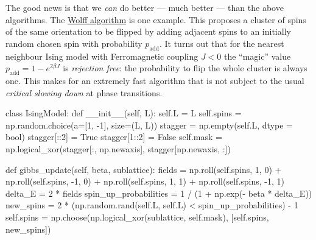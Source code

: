 \documentclass[
  letterpaper,
  DIV=11,
  numbers=noendperiod]{scrreprt}
\newenvironment{Shaded}{\begin{snugshade}}{\end{snugshade}}
\newcommand{\BuiltInTok}[1]{\textcolor[rgb]{0.00,0.23,0.31}{#1}}
\newcommand{\DecValTok}[1]{\textcolor[rgb]{0.68,0.00,0.00}{#1}}
\newcommand{\FunctionTok}[1]{\textcolor[rgb]{0.28,0.35,0.67}{#1}}
\newcommand{\KeywordTok}[1]{\textcolor[rgb]{0.00,0.23,0.31}{#1}}
\newcommand{\NormalTok}[1]{\textcolor[rgb]{0.00,0.23,0.31}{#1}}
\newcommand{\OperatorTok}[1]{\textcolor[rgb]{0.37,0.37,0.37}{#1}}
\newcommand{\VariableTok}[1]{\textcolor[rgb]{0.07,0.07,0.07}{#1}}
\theoremstyle{definition}
\theoremstyle{remark}
\begin{document}
The good news is that we \emph{can} do better --- much better --- than
the above algorithms. The
\href{https://en.wikipedia.org/wiki/Wolff_algorithm}{Wolff algorithm} is
one example. This proposes a cluster of spins of the same orientation to
be flipped by adding adjacent spins to an initially random chosen spin
with probability \(p_\text{add}\). It turns out that for the nearest
neighbour Ising model with Ferromagnetic coupling \(J<0\) the ``magic''
value \(p_\text{add}=1-e^{2\beta J}\) is \emph{rejection free}: the
probability to flip the whole cluster is always one. This makes for an
extremely fast algorithm that is not subject to the usual \emph{critical
slowing down} at phase transitions.

\begin{Shaded}
\begin{Highlighting}[]
\KeywordTok{class}\NormalTok{ IsingModel:}
    \KeywordTok{def} \FunctionTok{\_\_init\_\_}\NormalTok{(}\VariableTok{self}\NormalTok{, L):}
        \VariableTok{self}\NormalTok{.L }\OperatorTok{=}\NormalTok{ L}
        \VariableTok{self}\NormalTok{.spins }\OperatorTok{=}\NormalTok{ np.random.choice(a}\OperatorTok{=}\NormalTok{[}\DecValTok{1}\NormalTok{, }\OperatorTok{{-}}\DecValTok{1}\NormalTok{], size}\OperatorTok{=}\NormalTok{(L, L))}
\NormalTok{        stagger }\OperatorTok{=}\NormalTok{ np.empty(}\VariableTok{self}\NormalTok{.L, dtype }\OperatorTok{=} \BuiltInTok{bool}\NormalTok{)}
\NormalTok{        stagger[::}\DecValTok{2}\NormalTok{] }\OperatorTok{=} \VariableTok{True}
\NormalTok{        stagger[}\DecValTok{1}\NormalTok{::}\DecValTok{2}\NormalTok{] }\OperatorTok{=} \VariableTok{False}
        \VariableTok{self}\NormalTok{.mask }\OperatorTok{=}\NormalTok{ np.logical\_xor(stagger[:, np.newaxis], stagger[np.newaxis, :])}

    \KeywordTok{def}\NormalTok{ gibbs\_update(}\VariableTok{self}\NormalTok{, beta, sublattice):}
\NormalTok{        fields }\OperatorTok{=}\NormalTok{ np.roll(}\VariableTok{self}\NormalTok{.spins, }\DecValTok{1}\NormalTok{, }\DecValTok{0}\NormalTok{) }\OperatorTok{+}\NormalTok{ np.roll(}\VariableTok{self}\NormalTok{.spins, }\OperatorTok{{-}}\DecValTok{1}\NormalTok{, }\DecValTok{0}\NormalTok{) }\OperatorTok{+}\NormalTok{ np.roll(}\VariableTok{self}\NormalTok{.spins, }\DecValTok{1}\NormalTok{, }\DecValTok{1}\NormalTok{) }\OperatorTok{+}\NormalTok{ np.roll(}\VariableTok{self}\NormalTok{.spins, }\OperatorTok{{-}}\DecValTok{1}\NormalTok{, }\DecValTok{1}\NormalTok{)}
\NormalTok{        delta\_E }\OperatorTok{=} \DecValTok{2} \OperatorTok{*}\NormalTok{ fields}
\NormalTok{        spin\_up\_probabilities }\OperatorTok{=} \DecValTok{1} \OperatorTok{/}\NormalTok{ (}\DecValTok{1} \OperatorTok{+}\NormalTok{ np.exp(}\OperatorTok{{-}}\NormalTok{ beta }\OperatorTok{*}\NormalTok{ delta\_E))}
\NormalTok{        new\_spins }\OperatorTok{=} \DecValTok{2} \OperatorTok{*}\NormalTok{ (np.random.rand(}\VariableTok{self}\NormalTok{.L, }\VariableTok{self}\NormalTok{.L) }\OperatorTok{\textless{}}\NormalTok{ spin\_up\_probabilities) }\OperatorTok{{-}} \DecValTok{1}
        \VariableTok{self}\NormalTok{.spins }\OperatorTok{=}\NormalTok{ np.choose(np.logical\_xor(sublattice, }\VariableTok{self}\NormalTok{.mask), [}\VariableTok{self}\NormalTok{.spins, new\_spins])}


\end{Highlighting}
\end{Shaded}
\end{document}
